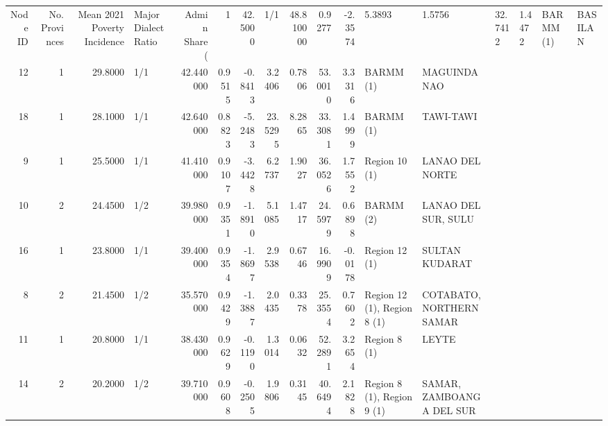\begin{tabular}{rrrlrrrrrrrll}
\toprule
Node ID & No. Provinces & Mean 2021 Poverty Incidence & Major Dialect Ratio & Admin Share (%
 & 1 & {} \color[HTML]{F1F1F1} 42.5000 & 1/1 & {} \color[HTML]{F1F1F1} 48.810000 & 0.9277 & -2.3574 & 5.3893 & 1.5756 & 32.7412 & 1.4472 & BARMM (1) & BASILAN \\
12 & 1 & {} \color[HTML]{000000} 29.8000 & 1/1 & {} \color[HTML]{000000} 42.440000 & 0.9515 & -0.8413 & 3.2406 & 0.7806 & 53.0010 & 3.3316 & BARMM (1) & MAGUINDANAO \\
18 & 1 & {} \color[HTML]{000000} 28.1000 & 1/1 & {} \color[HTML]{000000} 42.640000 & 0.8823 & -5.2483 & 23.5295 & 8.2865 & 33.3081 & 1.4999 & BARMM (1) & TAWI-TAWI \\
9 & 1 & {} \color[HTML]{000000} 25.5000 & 1/1 & {} \color[HTML]{000000} 41.410000 & 0.9107 & -3.4428 & 6.2737 & 1.9027 & 36.0526 & 1.7552 & Region 10 (1) & LANAO DEL NORTE \\
10 & 2 & {} \color[HTML]{000000} 24.4500 & 1/2 & {} \color[HTML]{000000} 39.980000 & 0.9351 & -1.8910 & 5.1085 & 1.4717 & 24.5979 & 0.6898 & BARMM (2) & LANAO DEL SUR, SULU \\
16 & 1 & {} \color[HTML]{000000} 23.8000 & 1/1 & {} \color[HTML]{000000} 39.400000 & 0.9354 & -1.8697 & 2.9538 & 0.6746 & 16.9909 & -0.0178 & Region 12 (1) & SULTAN KUDARAT \\
8 & 2 & {} \color[HTML]{000000} 21.4500 & 1/2 & {} \color[HTML]{F1F1F1} 35.570000 & 0.9429 & -1.3887 & 2.0435 & 0.3378 & 25.3554 & 0.7602 & Region 12 (1), Region 8 (1) & COTABATO, NORTHERN SAMAR \\
11 & 1 & {} \color[HTML]{000000} 20.8000 & 1/1 & {} \color[HTML]{000000} 38.430000 & 0.9629 & -0.1190 & 1.3014 & 0.0632 & 52.2891 & 3.2654 & Region 8 (1) & LEYTE \\
14 & 2 & {} \color[HTML]{000000} 20.2000 & 1/2 & {} \color[HTML]{000000} 39.710000 & 0.9608 & -0.2505 & 1.9806 & 0.3145 & 40.6494 & 2.1828 & Region 8 (1), Region 9 (1) & SAMAR, ZAMBOANGA DEL SUR \\

\end{tabular}
